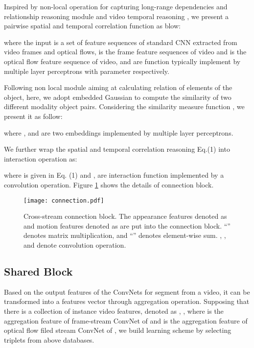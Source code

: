 \documentclass[conference,compsoc]{IEEEtran}
\begin{document}
Inspired by non-local operation for capturing long-range dependencies \cite{wang2018non} and relationship reasoning module \cite{santoro2017simple} and video temporal reasoning \cite{zhou2018temporal}, we present a pairwise spatial and temporal correlation function as blow:

where the input is a set of feature sequences of standard CNN extracted from video frames and optical flows,  is the frame feature sequences of  video and  is the optical flow feature sequence of  video, and   are function typically implement by multiple layer perceptrons with parameter  respectively.

Following non local module \cite{wang2018non} aiming at calculating relation of elements of the object, here, we adopt embedded Gaussian to compute the similarity of two different modality object pairs.  Considering the similarity measure function , we present it as follow:

where , and  are two embeddings implemented by multiple layer perceptrons.

We further wrap the spatial and temporal correlation reasoning Eq.(1) into interaction operation as:

where  is given in Eq. (1) and ,  are interaction function implemented by a convolution operation. Figure \ref{fig:connectin} shows the details of connection block.

\begin{figure}[h]
    \centering
    \texttt{[image: connection.pdf]}
    \caption{Cross-stream connection block. The appearance features denoted as  and motion features denoted as  are put into the connection block. ``'' denotes matrix multiplication, and ``'' denotes element-wise sum. , ,  and  denote  convolution operation.}
    \label{fig:connectin}
\end{figure}

\subsection{Shared Block}

Based on the output features of the ConvNets for  segment from a video, it can be transformed into a  features vector through aggregation operation. Supposing that there is a collection of  instance video features, denoted as , , where  is the aggregation feature of frame-stream ConvNet of  and  is the aggregation feature of optical flow filed stream ConvNet of , we build learning scheme by selecting triplets from above databases.
\end{document}
